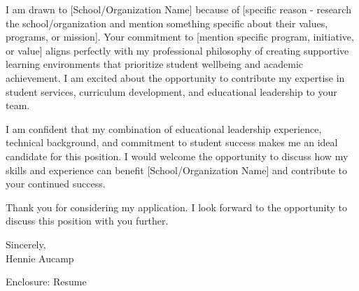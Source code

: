 \documentclass[11pt,a4paper]{article}
\begin{document}
I am drawn to [School/Organization Name] because of [specific reason - research the school/organization and mention something specific about their values, programs, or mission]. Your commitment to [mention specific program, initiative, or value] aligns perfectly with my professional philosophy of creating supportive learning environments that prioritize student wellbeing and academic achievement. I am excited about the opportunity to contribute my expertise in student services, curriculum development, and educational leadership to your team.

I am confident that my combination of educational leadership experience, technical background, and commitment to student success makes me an ideal candidate for this position. I would welcome the opportunity to discuss how my skills and experience can benefit [School/Organization Name] and contribute to your continued success.

Thank you for considering my application. I look forward to the opportunity to discuss this position with you further.

\vspace{1cm}

Sincerely, \\
\vspace{0.5cm}
Hennie Aucamp

\vspace{0.5cm}
Enclosure: Resume
\end{document}
